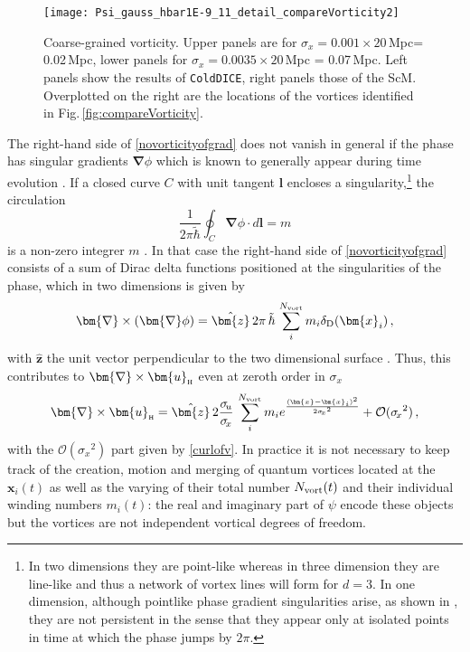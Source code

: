 \documentclass[twocolumn, nofootinbib, showpacs, superscriptaddress]{revtex4-1}
\renewcommand{\H}[0]{{\textsc{h}}}
\newcommand{\sigu}{{\sigma_{\! u}}}
\newcommand{\sigx}{{\sigma_{\! x}}}
\newcommand{\thbar}{\tilde\hbar}
\renewcommand{\v}[1]{\bm{#1} }
\newcommand{\vx}[0]{\bm{x} }
\newcommand{\vu}[0]{\bm{u} }
\newcommand{\vnabla}[0]{\bm{\nabla} }
\begin{document}
  \begin{figure}[t]
\texttt{[image: Psi\_gauss\_hbar1E-9\_11\_detail\_compareVorticity2]}\\
 \caption{Coarse-grained vorticity. Upper panels are for $\sigx=0.001\times 20$\,Mpc= 0.02\,Mpc, lower panels for $\sigx=0.0035\times 20$\,Mpc = 0.07\,Mpc. Left panels show the results of \texttt{ColdDICE}, right panels those of the ScM. Overplotted on the right are the locations of the vortices identified in Fig.\,\ref{fig:compareVorticity}.}
\label{fig:compareVorticity2}
\end{figure}

The right-hand side of \eqref{novorticityofgrad} does not vanish in general if the phase has singular gradients $\vnabla \phi$ which is known to generally appear during time evolution \cite{UhlemannKoppHaugg2014}. 
 If a closed curve $C$ with unit tangent $\v{l}$ encloses a singularity,\footnote{In two dimensions they are point-like whereas in three dimension
 they are line-like and thus a network of vortex lines will form for $d=3$. 
 In one dimension, although pointlike phase gradient singularities arise, as shown in  \cite{UhlemannKoppHaugg2014}, they are not persistent 
in the sense that they appear only at isolated points in time at which the phase jumps by $2\pi$.} the circulation 
 \begin{equation} \label{singlevaluedness}
 \frac{1}{ 2 \pi \thbar }\oint_{C} \vnabla \phi \cdot d\v{l} =m
 \end{equation}
  is a non-zero integrer $m$ \cite{PitaevskiiStringari2003,Wallstrom1994}. In that case the right-hand side of \eqref{novorticityofgrad} consists of a sum of Dirac delta functions positioned at the singularities of the phase, which in two dimensions is given by
  \begin{equation}
 \vnabla \times (\vnabla \phi) = \hat{\v{z}} \,2\pi\, \thbar \,\sum^{N_{\rm vort}}_{i} m_i \delta_{\rm D} (\v{x}_i) \,,  \label{withvorticityofgrad}
 \end{equation}
 with $\hat{\v{z}}$ the unit vector perpendicular to the two dimensional surface \cite{PitaevskiiStringari2003}.
Thus, this contributes to $\vnabla \times \vu_\H$ even at zeroth order in $\sigx$
  \begin{align} \label{curlofv2}
 \vnabla \times \vu_\H = \hat{\v{z}}\, 2\frac{\sigu}{\sigx} \,\sum^{N_{\rm vort}}_{i} m_i e^{\frac{(\v{x}-\v{x}_i)^2}{2 \sigx^2}} + \mathcal{O}(\sigx^2)\,,
\end{align} 
with the $\mathcal{O}(\sigx^2)$ part given by \eqref{curlofv}.
 In practice it is not necessary to keep track of the creation, motion and merging of quantum vortices located at the $\vx_i(t)$ 
as well as the varying of their total number $N_{\rm vort}(t)$ 
and their individual winding numbers $m_i(t)$: the real and imaginary part of $\psi$ 
encode these objects but the vortices are not independent vortical degrees of freedom.
\end{document}
